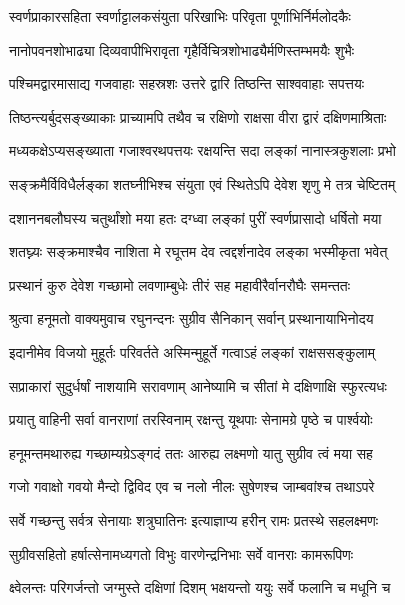 \twolineshloka
{स्वर्णप्राकारसहिता स्वर्णाट्टालकसंयुता}
{परिखाभिः परिवृता पूर्णाभिर्निर्मलोदकैः} %

\twolineshloka
{नानोपवनशोभाढ्या दिव्यवापीभिरावृता}
{गृहैर्विचित्रशोभाढ्यैर्मणिस्तम्भमयैः शुभैः} %

\twolineshloka
{पश्चिमद्वारमासाद्य गजवाहाः सहस्रशः}
{उत्तरे द्वारि तिष्ठन्ति साश्ववाहाः सपत्तयः} %

\twolineshloka
{तिष्ठन्त्यर्बुदसङ्ख्याकाः प्राच्यामपि तथैव च}
{रक्षिणो राक्षसा वीरा द्वारं दक्षिणमाश्रिताः} %

\twolineshloka
{मध्यकक्षेऽप्यसङ्ख्याता गजाश्वरथपत्तयः}
{रक्षयन्ति सदा लङ्कां नानास्त्रकुशलाः प्रभो} %

\twolineshloka
{सङ्क्रमैर्विविधैर्लङ्का शतघ्नीभिश्च संयुता}
{एवं स्थितेऽपि देवेश शृणु मे तत्र चेष्टितम्} %

\twolineshloka
{दशाननबलौघस्य चतुर्थांशो मया हतः}
{दग्ध्वा लङ्कां पुरीं स्वर्णप्रासादो धर्षितो मया} %

\twolineshloka
{शतघ्न्यः सङ्क्रमाश्चैव नाशिता मे रघूत्तम}
{देव त्वद्दर्शनादेव लङ्का भस्मीकृता भवेत्} %

\twolineshloka
{प्रस्थानं कुरु देवेश गच्छामो लवणाम्बुधेः}
{तीरं सह महावीरैर्वानरौघैः समन्ततः} %

\twolineshloka
{श्रुत्वा हनूमतो वाक्यमुवाच रघुनन्दनः}
{सुग्रीव सैनिकान् सर्वान् प्रस्थानायाभिनोदय} %

\twolineshloka
{इदानीमेव विजयो मुहूर्तः परिवर्तते}
{अस्मिन्मुहूर्ते गत्वाऽहं लङ्कां राक्षससङ्कुलाम्} %

\twolineshloka
{सप्राकारां सुदुर्धर्षां नाशयामि सरावणाम्}
{आनेष्यामि च सीतां मे दक्षिणाक्षि स्फुरत्यधः} %

\twolineshloka
{प्रयातु वाहिनी सर्वा वानराणां तरस्विनाम्}
{रक्षन्तु यूथपाः सेनामग्रे पृष्ठे च पार्श्वयोः} %

\twolineshloka
{हनूमन्तमथारुह्य गच्छाम्यग्रेऽङ्गदं ततः}
{आरुह्य लक्ष्मणो यातु सुग्रीव त्वं मया सह} %

\twolineshloka
{गजो गवाक्षो गवयो मैन्दो द्विविद एव च}
{नलो नीलः सुषेणश्च जाम्बवांश्च तथाऽपरे} %

\twolineshloka
{सर्वे गच्छन्तु सर्वत्र सेनायाः शत्रुघातिनः}
{इत्याज्ञाप्य हरीन् रामः प्रतस्थे सहलक्ष्मणः} %

\twolineshloka
{सुग्रीवसहितो हर्षात्सेनामध्यगतो विभुः}
{वारणेन्द्रनिभाः सर्वे वानराः कामरूपिणः} %

\twolineshloka
{क्ष्वेलन्तः परिगर्जन्तो जग्मुस्ते दक्षिणां दिशम्}
{भक्षयन्तो ययुः सर्वे फलानि च मधूनि च} %

